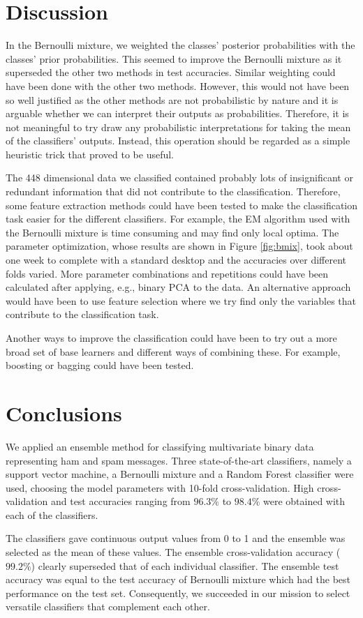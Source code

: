 \section{Discussion} \label{sec:discussion}

In the Bernoulli mixture, we weighted the classes' posterior
probabilities with the classes' prior probabilities. This seemed to
improve the Bernoulli mixture as it superseded the other two methods in
test accuracies. Similar weighting could have been done with the other
two methods. However, this would not have been so well justified as the
other methods are not probabilistic by nature and it is arguable whether
we can interpret their outputs as probabilities. Therefore, it is not
meaningful to try draw any probabilistic interpretations for taking the
mean of the classifiers' outputs. Instead, this operation should be
regarded as a simple heuristic trick that proved to be useful.

The 448 dimensional data we classified contained probably lots of
insignificant or redundant information that did not contribute to the
classification. Therefore, some feature extraction methods could have
been tested to make the classification task easier for the different
classifiers. For example, the EM algorithm used with the Bernoulli
mixture is time consuming and may find only local optima. The parameter
optimization, whose results are shown in Figure \ref{fig:bmix}, took
about one week to complete with a standard desktop and the accuracies
over different folds varied. More parameter combinations and repetitions
could have been calculated after applying, e.g., binary PCA to the data.
An alternative approach would have been to use feature selection where
we try find only the variables that contribute to the classification
task.

Another ways to improve the classification could have been to try out a
more broad set of base learners and different ways of combining these.
For example, boosting or bagging could have been tested.

\section{Conclusions}

We applied an ensemble method for classifying multivariate binary data
representing ham and spam messages. Three state-of-the-art classifiers,
namely a support vector machine, a Bernoulli mixture and a Random Forest
classifier were used, choosing the model parameters with 10-fold
cross-validation. High cross-validation and test accuracies ranging from
$96.3 \%$ to $98.4 \%$ were obtained with each of the classifiers.

The classifiers gave continuous output values from 0 to 1 and the
ensemble was selected as the mean of these values. The ensemble
cross-validation accuracy ($99.2 \%$) clearly superseded that of each
individual classifier. The ensemble test accuracy was equal to the test
accuracy of Bernoulli mixture which had the best performance on the test
set. Consequently, we succeeded in our mission to select versatile
classifiers that complement each other.
